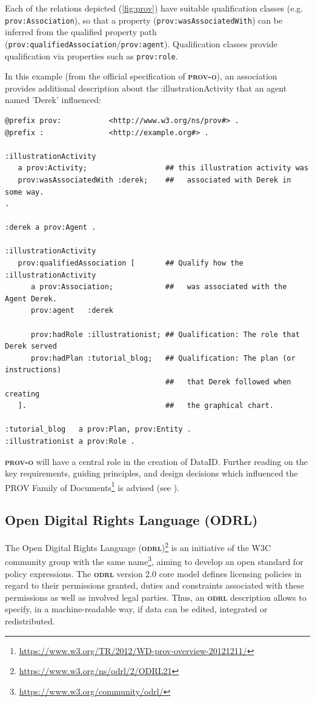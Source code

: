 \documentclass[a4paper,english,twoside,BCOR1.5cm,headsepline,DIV12,appendixprefix,final,12pt]{scrbook}
\newcommand{\odrl}{{\scshape\bfseries odrl}\xspace}
\newcommand{\prov}{{\scshape\bfseries prov-o}\xspace}
\newcommand{\prop}[1]{{{\texttt{#1}}}}
\newcommand\footnoteurl[1]{\footnote{\scriptsize\url{#1}}}
\begin{document}
Each of the relations depicted (\cref{fig:prov}) have suitable qualification classes (e.g. \prop{prov:Association}), so that a property (\prop{prov:wasAssociatedWith}) can be inferred from the qualified property path  (\prop{prov:qualifiedAssociation}/\prop{prov:agent}). Qualification classes provide qualification via properties such as \prop{prov:role}. 

In this example (from the official specification of \prov \cite{prov}), an association provides additional description about the :illustrationActivity that an agent named 'Derek' influenced:

\begin{lstlisting}[language=ttl, captionpos=b, label=lst:dcex,linewidth=\columnwidth,breaklines=true]
@prefix prov: 			<http://www.w3.org/ns/prov#> .
@prefix :     			<http://example.org#> .

:illustrationActivity
   a prov:Activity;                  ## this illustration activity was 
   prov:wasAssociatedWith :derek;    ##   associated with Derek in some way.
.

:derek a prov:Agent .

:illustrationActivity
   prov:qualifiedAssociation [       ## Qualify how the :illustrationActivity
      a prov:Association;            ##   was associated with the Agent Derek.
      prov:agent   :derek              

      prov:hadRole :illustrationist; ## Qualification: The role that Derek served
      prov:hadPlan :tutorial_blog;   ## Qualification: The plan (or instructions)
                                     ##   that Derek followed when creating 
   ].                                ##   the graphical chart.

:tutorial_blog   a prov:Plan, prov:Entity .
:illustrationist a prov:Role .
\end{lstlisting}

\prov will have a central role in the creation of DataID. Further reading on the key requirements, guiding principles, and design decisions which influenced the PROV Family of Documents\footnoteurl{https://www.w3.org/TR/2012/WD-prov-overview-20121211/} is advised (see \cite{MoreauProv2015}).

\subsection{Open Digital Rights Language (ODRL)}
\label{sec:odrl}
The Open Digital Rights Language (\odrl)\footnoteurl{https://www.w3.org/ns/odrl/2/ODRL21} is an initiative of the W3C community group with the same name\footnoteurl{https://www.w3.org/community/odrl/}, aiming to develop an open standard for policy expressions. 
The \odrl version 2.0 core model defines
licensing policies in regard to their permissions
granted, duties and constraints associated with these
permissions as well as involved legal parties. Thus, an \odrl
description allows to specify, in a machine-readable way, if
data can be edited, integrated or redistributed.
\end{document}
